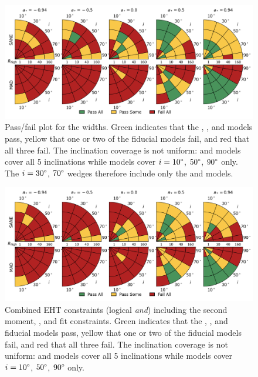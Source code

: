 \begin{figure}
 \centering
 \includegraphics[width=\textwidth]{./figures/Mring_w_Constraints.png}
  \caption{Pass/fail plot for the \mring widths.
    Green indicates that the \kharma, \bhac, and \hamr models pass, yellow that one or two of the fiducial models fail, and red that all three fail.
    The inclination coverage is not uniform: \bhac and \kharma models cover all 5 inclinations while \hamr models cover $i = 10\degree$, $50\degree$, $90\degree$ only.
    The $i = 30\degree$, $70\degree$ wedges therefore include only the \bhac and \kharma models.}
  \label{fig:mring_width_salsa}
\end{figure}

\begin{figure}
  \centering
  \includegraphics[width=\textwidth]{./figures/Interferometric_Constraints.png}
  \caption{Combined EHT constraints (logical {\em and}) including the second moment, \vam, and \mring fit constraints.
    Green indicates that the \kharma, \bhac, and \hamr fiducial models pass, yellow that one or two of the fiducial models fail, and red that all three fail.
    The inclination coverage is not uniform: \bhac and \kharma models cover all 5 inclinations while \hamr models cover $i = 10\degree$, $50\degree$, $90\degree$ only.}
  \label{fig:all_EHT_constraints}
\end{figure}

